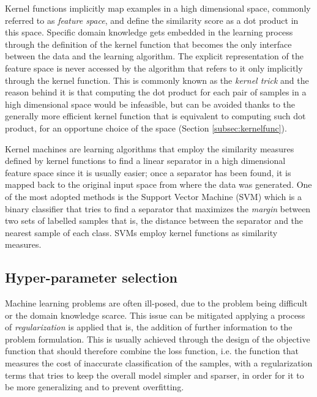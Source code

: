 Kernel functions implicitly map examples in a high dimensional space, commonly
referred to as \emph{feature space}, and define the similarity score as a dot
product in this space.
Specific domain knowledge gets embedded in the learning process through the definition
of the kernel function that becomes the only interface between the data
and the learning algorithm.
The explicit representation of the feature space is never accessed by the algorithm
that refers to it only implicitly through the kernel function.
This is commonly known as the \emph{kernel trick} and the reason behind it is 
that computing the dot product for each pair of samples in a high dimensional space
would be infeasible, but can be avoided thanks to the generally more efficient
kernel function that is equivalent to computing such dot product, for an opportune
choice of the space (Section \ref{subsec:kernelfunc}).

Kernel machines are learning algorithms that employ the similarity measures defined
by kernel functions to find a linear separator in a high dimensional feature space
since it is usually easier; once a separator has been found, it is mapped back
to the original input space from where the data was generated.
One of the most adopted methods is the Support Vector Machine (SVM) \cite{Cortes&Vapnik:1995}
which is a binary classifier that tries to find a separator that maximizes the \emph{margin}
between two sets of labelled samples that is, the distance between the separator and the
nearest sample of each class.
SVMs employ kernel functions as similarity measures.

\subsection{Hyper-parameter selection}
\label{subsec:hyper1}

Machine learning problems are often ill-posed, due to the problem being difficult or
the domain knowledge scarce.
This issue can be mitigated applying a process of \emph{regularization} is applied that is,
the addition of further information to the problem formulation.
This is usually achieved through the design of the objective function that should
therefore combine the loss function, i.e. the function that measures the cost of
inaccurate classification of the samples, with a regularization terms that tries
to keep the overall model simpler and sparser, in order for it to be more generalizing
and to prevent overfitting.

